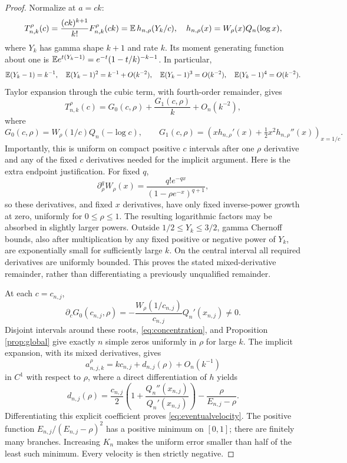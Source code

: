 \documentclass[11pt]{article}
\numberwithin{equation}{section}
\theoremstyle{definition}\newtheorem{definition}[theorem]{Definition}
\theoremstyle{remark}\newtheorem{remark}[theorem]{Remark}
\begin{document}
\begin{proof}
Normalize at $a=ck$:
\[
T_{n,k}^{\rho}(c)=\frac{(ck)^{k+1}}{k!}F_{n,k}^{\rho}(ck)
=\mathbb E\,h_{n,\rho}(Y_k/c),\quad h_{n,\rho}(x)=W_\rho(x)Q_n(\log x),
\]
where $Y_k$ has gamma shape $k+1$ and rate $k$. Its moment generating function about one is
$\mathbb E e^{t(Y_k-1)}=e^{-t}(1-t/k)^{-k-1}$. In particular,
\[
\mathbb E(Y_k-1)=k^{-1},\quad
\mathbb E(Y_k-1)^2=k^{-1}+O(k^{-2}),\quad
\mathbb E(Y_k-1)^3=O(k^{-2}),\quad
\mathbb E(Y_k-1)^4=O(k^{-2}).
\]
Taylor expansion through the cubic term, with fourth-order remainder, gives
\begin{equation}\label{eq:concentration}
T_{n,k}^{\rho}(c)=G_0(c,\rho)+\frac{G_1(c,\rho)}k+O_n(k^{-2}),
\end{equation}
where
\[
G_0(c,\rho)=W_\rho(1/c)Q_n(-\log c),\qquad
G_1(c,\rho)=\left(xh_{n,\rho}'(x)+\tfrac12x^2h_{n,\rho}''(x)\right)_{x=1/c}.
\]
Importantly, this is uniform on compact positive $c$ intervals after one $\rho$ derivative and any of the fixed $c$ derivatives needed for the implicit argument. Here is the extra endpoint justification. For fixed $q$,
\[
\partial_\rho^qW_\rho(x)=\frac{q!e^{-qx}}{(1-\rho e^{-x})^{q+1}},
\]
so these derivatives, and fixed $x$ derivatives, have only fixed inverse-power growth at zero, uniformly for $0\leq\rho\leq1$. The resulting logarithmic factors may be absorbed in slightly larger powers. Outside $1/2\leq Y_k\leq3/2$, gamma Chernoff bounds, also after multiplication by any fixed positive or negative power of $Y_k$, are exponentially small for sufficiently large $k$. On the central interval all required derivatives are uniformly bounded. This proves the stated mixed-derivative remainder, rather than differentiating a previously unqualified remainder.

At each $c=c_{n,j}$,
\[
\partial_cG_0(c_{n,j},\rho)
=-\frac{W_\rho(1/c_{n,j})}{c_{n,j}}Q_n'(x_{n,j})\ne0.
\]
Disjoint intervals around these roots, \eqref{eq:concentration}, and Proposition \ref{prop:global} give exactly $n$ simple zeros uniformly in $\rho$ for large $k$. The implicit expansion, with its mixed derivatives, gives
\[
a_{n,j,k}^{\rho}=kc_{n,j}+d_{n,j}(\rho)+O_n(k^{-1})
\]
in $C^1$ with respect to $\rho$, where a direct differentiation of $h$ yields
\[
d_{n,j}(\rho)=\frac{c_{n,j}}2\left(1+\frac{Q_n''(x_{n,j})}{Q_n'(x_{n,j})}\right)
-\frac{\rho}{E_{n,j}-\rho}.
\]
Differentiating this explicit coefficient proves \eqref{eq:eventualvelocity}. The positive function $E_{n,j}/(E_{n,j}-\rho)^2$ has a positive minimum on $[0,1]$; there are finitely many branches. Increasing $K_n$ makes the uniform error smaller than half of the least such minimum. Every velocity is then strictly negative.
\end{proof}
\end{document}
